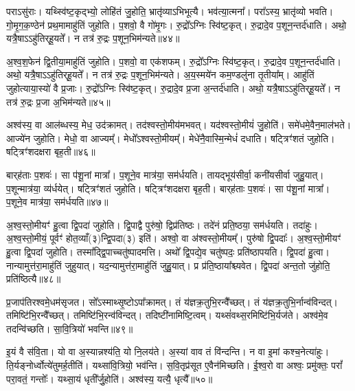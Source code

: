 पराऽसु॑राः।
यथ्स्वि॑ष्ट॒कृद्भ्यो॒ लोहि॑तं जु॒होति॒ भ्रातृ॑व्याऽभिभूत्यै।
भव॑त्या॒त्मना᳚।
परा᳚ऽस्य॒ भ्रातृ॑व्यो भवति।
गो॒मृ॒ग॒क॒ण्ठेन॑ प्रथ॒मामाहु॑तिं जुहोति।
प॒शवो॒ वै गो॑मृ॒गः।
रु॒द्रो᳚\-ऽग्निः स्वि॑ष्ट॒कृत्।
रु॒द्रादे॒व प॒शून॒न्तर्द॑धाति।
अथो॒ यत्रै॒षा\-ऽऽहु॑तिर्‌\mbox{}हू॒यते᳚।
न तत्र॑ रु॒द्रः प॒शून॒भिम॑न्यते॥४४॥

अ॒श्व॒श॒फेन॑ द्वि॒तीया॒माहु॑तिं जुहोति।
प॒शवो॒ वा एक॑शफम्।
रु॒द्रो᳚\-ऽग्निः स्वि॑ष्ट॒कृत्।
रु॒द्रादे॒व प॒शून॒न्तर्द॑धाति।
अथो॒ यत्रै॒षा\-ऽऽहु॑तिर्‌\mbox{}हू॒यते᳚।
न तत्र॑ रु॒द्रः प॒शून॒भिम॑न्यते।
अ॒य॒स्मये॑न कम॒ण्डलु॑ना तृ॒तीया᳚म्।
आहु॑तिं जुहोत्याया॒स्यो॑ वै प्र॒जाः।
रु॒द्रो᳚\-ऽग्निः स्वि॑ष्ट॒कृत्।
रु॒द्रादे॒व प्र॒जा अ॒न्तर्द॑धाति।
अथो॒ यत्रै॒षा\-ऽऽहु॑तिर्‌\mbox{}हू॒यते᳚।
न तत्र॑ रु॒द्रः प्र॒जा अ॒भिम॑न्यते॥४५॥\anuvakamend[द॒धा॒त्यभ॑वन्मन्यते प्र॒जा अ॒न्तर्द॑धाति॒ द्वे च॑ ]

अश्व॑स्य॒ वा आल॑ब्धस्य॒ मेध॒ उद॑क्रामत्।
तद॑श्वस्तो॒मीय॑\-मभवत्।
यद॑श्वस्तो॒मीयं॑ जु॒होति॑।
समे॑धमे॒वैन॒माल॑भते।
आज्ये॑न जुहोति।
मेधो॒ वा आज्यम्᳚।
मेधो᳚\-ऽश्वस्तो॒मीयम्᳚।
मेधे॑नै॒वास्मि॒न्मेधं॑ दधाति।
षट्त्रिꣳ॑शतं जुहोति।
षट्त्रिꣳ॑शदक्षरा बृह॒ती॥४६॥

बार्‌\mbox{}ह॑ताः प॒शवः॑।
सा प॑शू॒नां मात्रा᳚।
प॒शूने॒व मात्र॑या॒ सम॑र्धयति।
तायद्भूय॑सीर्वा॒ कनी॑यसीर्वा जुहु॒यात्।
प॒शून्मात्र॑या॒ व्य॑र्धयेत्।
षट्त्रिꣳ॑शतं जुहोति।
षट्त्रिꣳ॑शदक्षरा बृह॒ती।
बार्‌\mbox{}ह॑ताः प॒शवः॑।
सा प॑शू॒नां मात्रा᳚।
प॒शूने॒व मात्र॑या॒ सम॑र्धयति॥४७॥

अ॒श्व॒स्तो॒मीयꣳ॑ हु॒त्वा द्वि॒पदा॑ जुहोति।
द्वि॒पाद्वै पुरु॑षो॒ द्विप्र॑तिष्ठः।
तदे॑नं प्रति॒ष्ठया॒ सम॑र्धयति।
तदा॑हुः।
अ॒श्व॒स्तो॒मीयं॒ पूर्वꣳ॑ होत॒व्याँ(३)न्द्वि॒पदा(३) इति॑।
अश्वो॒ वा अ॑श्वस्तो॒मीयम्᳚।
पुरु॑षो द्वि॒पदाः᳚।
अ॒श्व॒स्तो॒मीयꣳ॑ हु॒त्वा द्वि॒पदा॑ जुहोति।
तस्मा᳚द्\-द्वि॒पाच्चतु॑ष्पादमत्ति।
अथो᳚ द्वि॒पद्ये॒व चतु॑ष्पदः॒ प्रति॑\-ष्ठापयति।
द्वि॒पदा॑ हु॒त्वा।
नान्यामुत्त॑रा॒माहु॑तिं जुहुयात्।
यद॒न्यामुत्त॑रा॒माहु॑तिं जुहु॒यात्।
प्र प्र॑ति॒ष्ठाया᳚श्च्यवेत।
द्वि॒पदा॑ अन्त॒तो जु॑होति॒ प्रति॑\-ष्ठित्यै॥४८॥

प्र॒जा\-प॑तिरश्वमे॒धम॑\-सृजत।
सो᳚ऽस्माथ्सृ॒ष्टो\-ऽपा᳚क्रामत्।
तं य॑ज्ञ\-क्र॒तुभि॒रन्वै᳚च्छत्।
तं य॑ज्ञ\-क्र॒तुभि॒र्नान्व॑विन्दत्।
तमिष्टि॑भि॒रन्वै᳚च्छत्।
तमिष्टि॑भि॒रन्व॑विन्दत्।
तदिष्टी॑नामिष्टि॒\-त्वम्।
यथ्सं॑वथ्स॒रमिष्टि॑\-भि॒र्यज॑ते।
अश्व॑मे॒व तदन्वि॑च्छति।
सा॒वि॒त्रियो॑ भवन्ति॥४९॥

इ॒यं वै स॑वि॒ता।
यो वा अ॒स्यान्नश्य॑ति॒ यो नि॒लय॑ते।
अ॒स्यां वाव तं वि॑न्दन्ति।
न वा इ॒मां कश्च॒नेत्या॑हुः।
ति॒र्यङ्नोर्ध्वोत्ये॑तुमर्ह॒तीति॑।
यथ्सा॑वि॒त्रियो॒ भव॑न्ति।
स॒वि॒तृ\-प्र॑सूत ए॒वैन॑मिच्छति।
ई॒श्व॒रो वा अश्वः॒ प्रमु॑क्तः॒ परां᳚ परा॒वतं॒ गन्तोः᳚।
यथ्सा॒यं धृती᳚र्जु॒होति॑।
अश्व॑स्य॒ यत्यै॒ धृत्यै᳚॥५०॥

